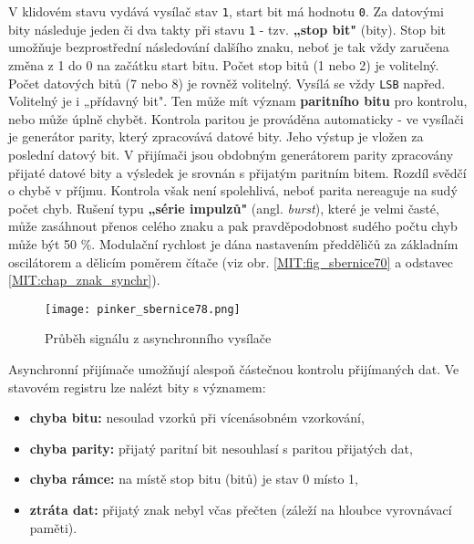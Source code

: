         V klidovém stavu vydává vysílač stav \texttt{1}, start bit má hodnotu \texttt{0}. Za
        datovými bity následuje jeden či dva takty při stavu \texttt{1} - tzv. \textbf{„stop bit"}
        (bity). Stop bit umožňuje bezprostřední následování dalšího znaku, neboť je tak vždy
        zaručena změna z 1 do 0 na začátku start bitu. Počet stop bitů (1 nebo 2) je volitelný.
        Počet datových bitů (7 nebo 8) je rovněž volitelný. Vysílá se vždy \texttt{LSB} napřed.
        Volitelný je i „přídavný bit". Ten může mít význam \textbf{paritního bitu} pro kontrolu,
        nebo může úplně chybět. Kontrola paritou je prováděna automaticky - ve vysílači je generátor
        parity, který zpracovává datové bity. Jeho výstup je vložen za poslední datový bit. V
        přijímači jsou obdobným generátorem parity zpracovány přijaté datové bity a výsledek je
        srovnán s přijatým paritním bitem. Rozdíl svědčí o chybě v příjmu. Kontrola však není
        spolehlivá, neboť parita nereaguje na sudý počet chyb. Rušení typu \textbf{„série impulzů"}
        (angl. \emph{burst}), které je velmi časté, může zasáhnout přenos celého znaku a pak
        pravděpodobnost sudého počtu chyb může být 50 \%. Modulační rychlost je dána nastavením
        předděličů za základním oscilátorem a dělicím poměrem čítače (viz obr.
        \ref{MIT:fig_sbernice70} a odstavec \ref{MIT:chap_znak_synchr}).
      
        \begin{figure}[ht!] %
          \centering
          \texttt{[image: pinker\_sbernice78.png]}
          \caption{Průběh signálu z asynchronního vysílače}
          \label{MIT:fig_sbernice78}
        \end{figure}
        
        Asynchronní přijímače umožňují alespoň částečnou kontrolu přijímaných dat. Ve stavovém 
        registru lze nalézt bity s významem:
        \begin{itemize}[noitemsep]
          \item \textbf{chyba bitu:} nesoulad vzorků při vícenásobném vzorkování,
          \item \textbf{chyba parity:} přijatý paritní bit nesouhlasí s paritou přijatých dat,
          \item \textbf{chyba rámce:} na místě stop bitu (bitů) je stav 0 místo 1,
          \item \textbf{ztráta dat:} přijatý znak nebyl včas přečten (záleží na hloubce vyrovnávací 
                 paměti).          
        \end{itemize}
        
